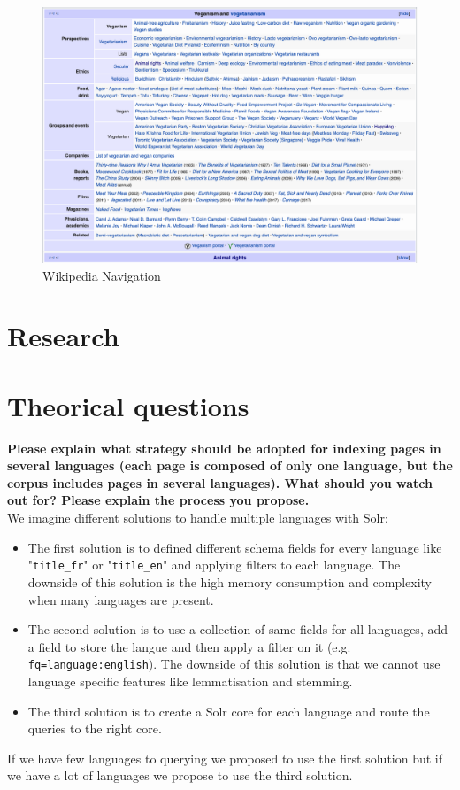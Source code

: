\documentclass[a4paper]{article}
\begin{document}
\begin{figure}[H]
	\includegraphics[scale=0.5]{imgs/navigation}
	\caption{Wikipedia Navigation}
	\label{fig:navigation}
\end{figure}

\section{Research}


\section{Theorical questions}
\textbf{Please explain what strategy should be adopted for indexing pages in several languages (each page is composed of only one language, but the corpus includes pages in several languages). What should you watch out for? Please explain the process you propose.} \\

We imagine different solutions to handle multiple languages with Solr:
\begin{itemize}  
	\item The first solution is to defined different schema fields for every language like "\texttt{title\_fr}" or "\texttt{title\_en}" and applying filters to each language. The downside of this solution is the high memory consumption and complexity when many languages are present.
	\item The second solution is to use a collection of same fields for all languages, add a field to store the langue and then apply a filter on it (e.g. \texttt{fq=language:english}). The downside of this solution is that we cannot use language specific features like lemmatisation and stemming.
	\item The third solution is to create a Solr core for each language and route the queries to the right core.
\end{itemize}
If we have few languages to querying we proposed to use the first solution but if we have a lot of languages we propose to use the third solution. \\
\end{document}
